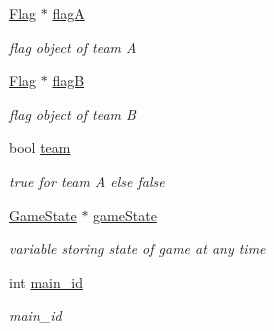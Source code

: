 \begin{DoxyCompactItemize}
\item 
\hyperlink{class_flag}{Flag} $\ast$ \hyperlink{class_client_ad2cd0bb4fa66af68764cafe6a57a4ef0}{flagA}\hypertarget{class_client_ad2cd0bb4fa66af68764cafe6a57a4ef0}{}\label{class_client_ad2cd0bb4fa66af68764cafe6a57a4ef0}

\begin{DoxyCompactList}\small\item\em flag object of team A \end{DoxyCompactList}\item 
\hyperlink{class_flag}{Flag} $\ast$ \hyperlink{class_client_af278654fb2b57c88268fdf1abcf3d148}{flagB}\hypertarget{class_client_af278654fb2b57c88268fdf1abcf3d148}{}\label{class_client_af278654fb2b57c88268fdf1abcf3d148}

\begin{DoxyCompactList}\small\item\em flag object of team B \end{DoxyCompactList}\item 
bool \hyperlink{class_client_a6166f3ac78f8d5d129e7d399c7fec6d1}{team}\hypertarget{class_client_a6166f3ac78f8d5d129e7d399c7fec6d1}{}\label{class_client_a6166f3ac78f8d5d129e7d399c7fec6d1}

\begin{DoxyCompactList}\small\item\em true for team A else false \end{DoxyCompactList}\item 
\hyperlink{class_game_state}{Game\+State} $\ast$ \hyperlink{class_client_a3f83510cc4a7fdb031ffec0525947769}{game\+State}\hypertarget{class_client_a3f83510cc4a7fdb031ffec0525947769}{}\label{class_client_a3f83510cc4a7fdb031ffec0525947769}

\begin{DoxyCompactList}\small\item\em variable storing state of game at any time \end{DoxyCompactList}\item 
int \hyperlink{class_client_a742a83ff0e57b4a621369a293151eec5}{main\+\_\+id}\hypertarget{class_client_a742a83ff0e57b4a621369a293151eec5}{}\label{class_client_a742a83ff0e57b4a621369a293151eec5}

\begin{DoxyCompactList}\small\item\em main\+\_\+id \end{DoxyCompactList}\end{DoxyCompactItemize}


